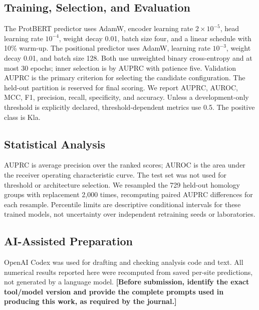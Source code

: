 \documentclass[twocolumn]{article}
\begin{document}
\subsection{Training, Selection, and Evaluation}
The ProtBERT predictor uses AdamW, encoder learning rate $2\times10^{-5}$,
head learning rate $10^{-4}$, weight decay 0.01, batch size four, and a
linear schedule with 10\% warm-up. The positional predictor uses AdamW,
learning rate $10^{-3}$, weight decay 0.01, and batch size 128. Both use
unweighted binary cross-entropy and at most 30 epochs; inner selection is
by AUPRC with patience five. Validation AUPRC is the primary criterion
for selecting the candidate configuration. The held-out partition is
reserved for final scoring. We report AUPRC, AUROC, MCC, F1, precision,
recall, specificity, and accuracy. Unless a development-only threshold
is explicitly declared, threshold-dependent metrics use 0.5. The
positive class is Kla.

\subsection{Statistical Analysis}
AUPRC is average precision over the ranked scores;
AUROC is the area under the receiver operating characteristic curve.
The test set was not used for threshold or architecture selection.
We resampled the 729 held-out homology groups with replacement 2,000 times,
recomputing paired AUPRC differences for each resample. Percentile limits
are descriptive conditional intervals for these trained models, not
uncertainty over independent retraining seeds or laboratories.

\subsection{AI-Assisted Preparation}
OpenAI Codex was used for drafting and checking analysis code and text.
All numerical results reported here were recomputed from saved per-site
predictions, not generated by a language model. \textbf{[Before submission,
identify the exact tool/model version and provide the complete prompts
used in producing this work, as required by the journal.]}
\end{document}
